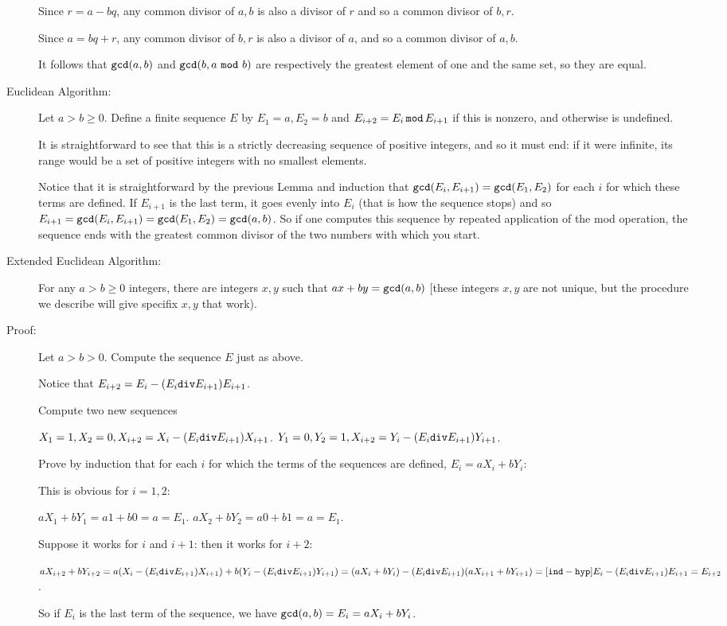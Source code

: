 \documentclass[12pt]{article}
\begin{document}
\begin{description}
Since $r=a-bq$, any common divisor of $a,b$ is also a divisor of $r$ and so a common divisor of $b,r$.

Since $a=bq+r$, any common divisor of $b,r$ is also a divisor of $a$, and so a common divisor of $a,b$.

It follows that ${\tt gcd}(a,b)$ and ${\tt gcd}(b,a\,\,{\tt mod}\,\,b)$ are respectively the greatest element of one and the same set, so they are equal.

\item[Euclidean Algorithm:]

Let $a>b\geq 0$.  Define a finite sequence $E$ by $E_1=a, E_2=b$ and $E_{i+2}= E_i \,{\tt mod}\, E_{i+1}$ if this is nonzero, and otherwise is undefined.

It is straightforward to see that this is a strictly decreasing sequence of positive integers, and so it must end:  if it were infinite, its range would be a set of positive integers with no smallest elements.

Notice that it is straightforward by the previous Lemma and induction that ${\tt gcd}(E_i,E_{i+1}) = {\tt gcd}(E_1,E_2)$ for each $i$ for which these terms are defined.  If $E_{i+1}$ is the last term, it goes evenly into $E_i$ (that is how the sequence stops) and so $E_{i+1}={\tt gcd}(E_i,E_{i+1}) = {\tt gcd}(E_1,E_2)= {\tt gcd}(a,b)$.  So if one computes this sequence by repeated application of the mod operation, the sequence ends with the greatest common divisor of the two numbers with which you start.

\item[Extended Euclidean Algorithm:]  For any $a>b\geq0$ integers, there are integers $x,y$ such that $ax+by={\tt gcd}(a,b)$ [these integers $x,y$ are not unique, but the procedure we describe will give specifix $x,y$ that work).

\item[Proof:]  Let $a>b>0$.  Compute the sequence $E$ just as above.  

Notice that $E_{i+2}= E_i - (E_i {\tt div}E_{i+1})E_{i+1}$.

Compute two new sequences

$X_1=1, X_2=0, X_{i+2}= X_i - (E_i {\tt div}E_{i+1})X_{i+1}$.
$Y_1=0, Y_2=1, X_{i+2}= Y_i - (E_i {\tt div}E_{i+1})Y_{i+1}$.

Prove by induction that for each $i$ for which the terms of the sequences are defined, $E_i = aX_i + bY_i$:

This is obvious for $i=1,2$:

$aX_1+bY_1 = a1+b0 = a = E_1$.
$aX_2+bY_2 = a0+b1 = a = E_1$.

Suppose it works for $i$ and $i+1$:  then it works for $i+2$:

$aX_{i+2} +bY_{i+2} = a(X_i - (E_i {\tt div}E_{i+1})X_{i+1}) + b(Y_i - (E_i {\tt div}E_{i+1})Y_{i+1}) = (aX_i+bY_i) - (E_i {\tt div}E_{i+1})(aX_{i+1}+bY_{i+1}) =[{\tt ind-hyp}] E_i - (E_i {\tt div}E_{i+1})E_{i+1} = E_{i+2}$.

So if $E_i$ is the last term of the sequence, we have ${\tt gcd}(a,b)=E_i = aX_i +bY_i$.


\end{description}
\end{document}
